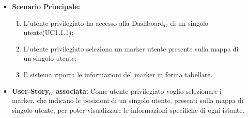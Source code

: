 \documentclass[11pt]{article}
\begin{document}
\begin{justify}
\begin{itemize}
      \item \textbf{Scenario Principale:}
        \begin{enumerate}
            \item L'utente privilegiato ha accesso alla Dashboard$_G$ di un singolo utente(UC1.1.1);
            \item L'utente privilegiato seleziona un marker utente presente sulla mappa di un singolo utente;
            \item Il sistema riporta le informazioni del marker in forma tabellare.
        \end{enumerate}
     \item \textbf{User-Story$_G$ associata:}
       Come utente privilegiato voglio selezionare i marker, che indicano le posizioni di un singolo utente, presenti sulla mappa di singolo utente, per poter visualizzare le informazioni specifiche di ogni istante.
\end{itemize}


\end{justify}
\end{document}
